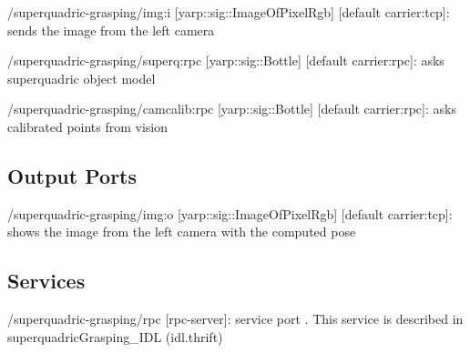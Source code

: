 \begin{DoxyItemize}
\item /superquadric-\/grasping/img\-:i \mbox{[}yarp\-::sig\-::\-Image\-Of\-Pixel\-Rgb\mbox{]} \mbox{[}default carrier\-:tcp\mbox{]}\-: sends the image from the left camera
\item /superquadric-\/grasping/superq\-:rpc \mbox{[}yarp\-::sig\-::\-Bottle\mbox{]} \mbox{[}default carrier\-:rpc\mbox{]}\-: asks superquadric object model
\item /superquadric-\/grasping/camcalib\-:rpc \mbox{[}yarp\-::sig\-::\-Bottle\mbox{]} \mbox{[}default carrier\-:rpc\mbox{]}\-: asks calibrated points from vision
\end{DoxyItemize}\hypertarget{group__superquadric-grasping_outputports_sec}{}\subsection{Output Ports}\label{group__superquadric-grasping_outputports_sec}

\begin{DoxyItemize}
\item /superquadric-\/grasping/img\-:o \mbox{[}yarp\-::sig\-::\-Image\-Of\-Pixel\-Rgb\mbox{]} \mbox{[}default carrier\-:tcp\mbox{]}\-: shows the image from the left camera with the computed pose
\end{DoxyItemize}\hypertarget{group__superquadric-grasping_services_sec}{}\subsection{Services}\label{group__superquadric-grasping_services_sec}

\begin{DoxyItemize}
\item /superquadric-\/grasping/rpc \mbox{[}rpc-\/server\mbox{]}\-: service port . This service is described in superquadric\-Grasping\-\_\-\-I\-D\-L (idl.\-thrift) 
\end{DoxyItemize}
